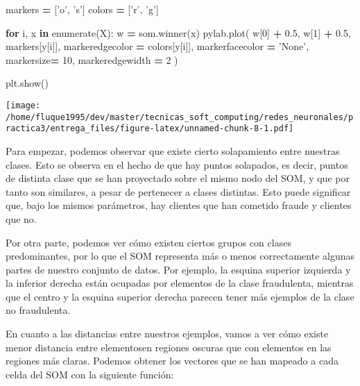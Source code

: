 \documentclass[
  a4paper,
,tablecaptionabove
]{scrartcl}
\newenvironment{Shaded}{\begin{snugshade}}{\end{snugshade}}
\newcommand{\BuiltInTok}[1]{#1}
\newcommand{\ControlFlowTok}[1]{\textcolor[rgb]{0.13,0.29,0.53}{\textbf{#1}}}
\newcommand{\DecValTok}[1]{\textcolor[rgb]{0.00,0.00,0.81}{#1}}
\newcommand{\FloatTok}[1]{\textcolor[rgb]{0.00,0.00,0.81}{#1}}
\newcommand{\KeywordTok}[1]{\textcolor[rgb]{0.13,0.29,0.53}{\textbf{#1}}}
\newcommand{\NormalTok}[1]{#1}
\newcommand{\OperatorTok}[1]{\textcolor[rgb]{0.81,0.36,0.00}{\textbf{#1}}}
\newcommand{\StringTok}[1]{\textcolor[rgb]{0.31,0.60,0.02}{#1}}
\begin{document}
\begin{Shaded}
\begin{Highlighting}[]
\NormalTok{markers }\OperatorTok{=}\NormalTok{ [}\StringTok{'o'}\NormalTok{, }\StringTok{'s'}\NormalTok{]}
\NormalTok{colors }\OperatorTok{=}\NormalTok{ [}\StringTok{'r'}\NormalTok{, }\StringTok{'g'}\NormalTok{]}

\ControlFlowTok{for}\NormalTok{ i, x }\KeywordTok{in} \BuiltInTok{enumerate}\NormalTok{(X):}
\NormalTok{    w }\OperatorTok{=}\NormalTok{ som.winner(x)}
\NormalTok{    pylab.plot(}
\NormalTok{        w[}\DecValTok{0}\NormalTok{] }\OperatorTok{+} \FloatTok{0.5}\NormalTok{,}
\NormalTok{        w[}\DecValTok{1}\NormalTok{] }\OperatorTok{+} \FloatTok{0.5}\NormalTok{,}
\NormalTok{        markers[y[i]],}
\NormalTok{        markeredgecolor }\OperatorTok{=}\NormalTok{ colors[y[i]],}
\NormalTok{        markerfacecolor }\OperatorTok{=} \StringTok{'None'}\NormalTok{,}
\NormalTok{        markersize}\OperatorTok{=} \DecValTok{10}\NormalTok{,}
\NormalTok{        markeredgewidth }\OperatorTok{=} \DecValTok{2}
\NormalTok{    )}

\NormalTok{plt.show()}
\end{Highlighting}
\end{Shaded}

\texttt{[image: /home/fluque1995/dev/master/tecnicas\_soft\_computing/redes\_neuronales/practica3/entrega\_files/figure-latex/unnamed-chunk-8-1.pdf]}

Para empezar, podemos observar que existe cierto solapamiento entre
nuestras clases. Esto se observa en el hecho de que hay puntos
solapados, es decir, puntos de distinta clase que se han proyectado
sobre el mismo nodo del SOM, y que por tanto son similares, a pesar de
pertenecer a clases distintas. Esto puede significar que, bajo los
mismos parámetros, hay clientes que han cometido fraude y clientes que
no.

Por otra parte, podemos ver cómo existen ciertos grupos con clases
predominantes, por lo que el SOM representa más o menos correctamente
algunas partes de nuestro conjunto de datos. Por ejemplo, la esquina
superior izquierda y la inferior derecha están ocupadas por elementos de
la clase fraudulenta, mientras que el centro y la esquina superior
derecha parecen tener más ejemplos de la clase no fraudulenta.

En cuanto a las distancias entre nuestros ejemplos, vamos a ver cómo
existe menor distancia entre elementosen regiones oscuras que con
elementos en las regiones más claras. Podemos obtener los vectores que
se han mapeado a cada celda del SOM con la siguiente función:
\end{document}
